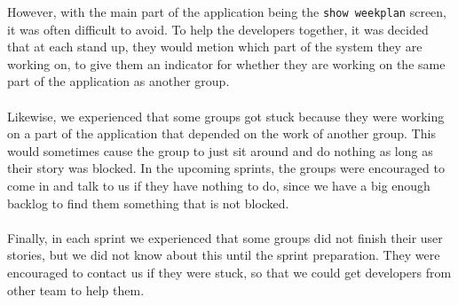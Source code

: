 However, with the main part of the application being the \texttt{show weekplan} screen, it was often difficult to avoid. 
To help the developers together, it was decided that at each stand up, they would metion which part of the system they are working on, to give them an indicator for whether they are working on the same part of the application as another group.
\\\\
Likewise, we experienced that some groups got stuck because they were working on a part of the application that depended on the work of another group.
This would sometimes cause the group to just sit around and do nothing as long as their story was blocked.
In the upcoming sprints, the groups were encouraged to come in and talk to us if they have nothing to do, since we have a big enough backlog to find them something that is not blocked.
\\\\
Finally, in each sprint we experienced that some groups did not finish their user stories, but we did not know about this until the sprint preparation.
They were encouraged to contact us if they were stuck, so that we could get developers from other team to help them.
\\\\
